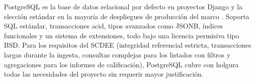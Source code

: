 PostgreSQL es la base de datos relacional por defecto en proyectos Django
y la elección estándar en la mayoría de despliegues de producción del
marco \cite{postgresql}. Soporta SQL estándar, transacciones \acs{acid},
tipos avanzados como JSONB, índices funcionales y un sistema de
extensiones, todo bajo una licencia permisiva tipo BSD. Para los
requisitos del SCDEE (integridad referencial estricta, transacciones
largas durante la ingesta, consultas complejas para los listados con
filtros y agregaciones para los informes de calificación), PostgreSQL
cubre con holgura todas las necesidades del proyecto sin requerir mayor
justificación.
